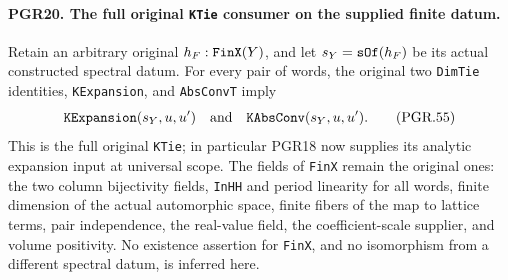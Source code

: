 \documentclass[11pt,a4paper]{article}
\numberwithin{equation}{section}
\theoremstyle{remark}\newtheorem{remark}[theorem]{Remark}
\begin{document}
\paragraph{PGR20. The full original \texttt{KTie} consumer on the supplied finite datum.}
\label{claim:PGR20}
Retain an arbitrary original \(h_F:\texttt{Fin\allowbreak X}(Y)\), and let
\(s_Y=\texttt{s\allowbreak Of}(h_F)\) be its actual constructed spectral
datum.  For every pair of words, the original two
\texttt{Dim\allowbreak Tie} identities, \texttt{KExpansion}, and
\texttt{Abs\allowbreak Conv\allowbreak T} imply
\[
     \texttt{KExpansion}(s_Y,u,u')
                     \quad\hbox{and}\quad
     \texttt{KAbs\allowbreak Conv}(s_Y,u,u').
\tag{PGR.55}
\]
This is the full original \texttt{KTie}; in particular PGR18
now supplies its analytic expansion input at universal scope.
The fields of \texttt{Fin\allowbreak X} remain the original ones: the two
column bijectivity fields, \texttt{In\allowbreak HH} and period linearity
for all words, finite dimension of the actual automorphic space,
finite fibers of the map to lattice terms, pair independence,
the real-value field, the coefficient-scale supplier, and volume
positivity.  No existence assertion for \texttt{Fin\allowbreak X}, and no
isomorphism from a different spectral datum, is inferred here.
\end{document}
